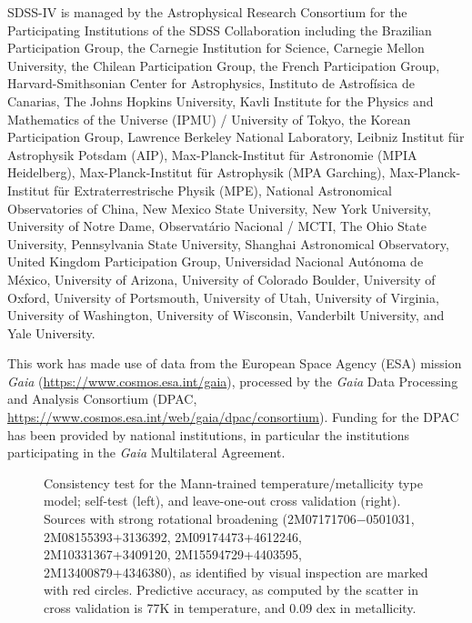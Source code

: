\documentclass[modern]{aastex62}
\begin{document}
SDSS-IV is managed by the Astrophysical Research Consortium for the 
Participating Institutions of the SDSS Collaboration including the 
Brazilian Participation Group, the Carnegie Institution for Science, 
Carnegie Mellon University, the Chilean Participation Group, the French Participation Group, Harvard-Smithsonian Center for Astrophysics, 
Instituto de Astrof\'isica de Canarias, The Johns Hopkins University, 
Kavli Institute for the Physics and Mathematics of the Universe (IPMU) / 
University of Tokyo, the Korean Participation Group, Lawrence Berkeley National Laboratory, 
Leibniz Institut f\"ur Astrophysik Potsdam (AIP),  
Max-Planck-Institut f\"ur Astronomie (MPIA Heidelberg), 
Max-Planck-Institut f\"ur Astrophysik (MPA Garching), 
Max-Planck-Institut f\"ur Extraterrestrische Physik (MPE), 
National Astronomical Observatories of China, New Mexico State University, 
New York University, University of Notre Dame, 
Observat\'ario Nacional / MCTI, The Ohio State University, 
Pennsylvania State University, Shanghai Astronomical Observatory, 
United Kingdom Participation Group,
Universidad Nacional Aut\'onoma de M\'exico, University of Arizona, 
University of Colorado Boulder, University of Oxford, University of Portsmouth, 
University of Utah, University of Virginia, University of Washington, University of Wisconsin, 
Vanderbilt University, and Yale University.

This work has made use of data from the European Space Agency (ESA) mission
{\it Gaia} (\url{https://www.cosmos.esa.int/gaia}), processed by the {\it Gaia}
Data Processing and Analysis Consortium (DPAC,
\url{https://www.cosmos.esa.int/web/gaia/dpac/consortium}). Funding for the DPAC
has been provided by national institutions, in particular the institutions
participating in the {\it Gaia} Multilateral Agreement.

\color{gcolor}{HOGG: grants etc}\color{black} 

\color{gcolor}{ADAM: grants etc, FAST acknowledgement?}\color{black}


\newpage

\begin{figure}[ht]
\caption{Consistency test for the Mann-trained temperature/metallicity type model; self-test (left), and leave-one-out cross validation (right). Sources with strong rotational broadening (2M07171706−0501031, 2M08155393+3136392, 2M09174473+4612246, 2M10331367+3409120, 2M15594729+4403595, 2M13400879+4346380), as identified by visual inspection are marked with red circles. Predictive accuracy, as computed by the scatter in cross validation is 77K in temperature, and 0.09 dex in metallicity.} \label{fig:mann_validation}
\end{figure}
\end{document}

